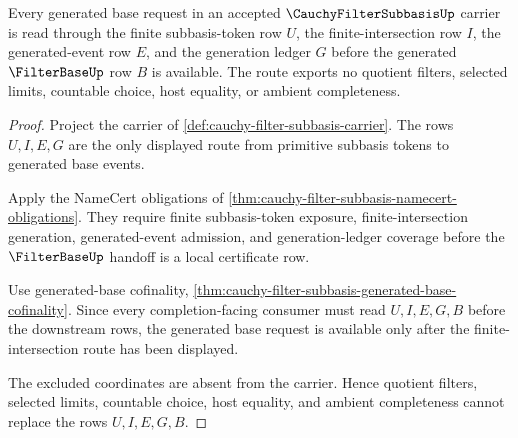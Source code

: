 \begin{theorem}
\label{thm:cauchy-filter-subbasis-finite-intersection-route}
Every generated base request in an accepted $\CauchyFilterSubbasisUp$ carrier is read through the finite subbasis-token row $U$, the finite-intersection row $I$, the generated-event row $E$, and the generation ledger $G$ before the generated $\FilterBaseUp$ row $B$ is available. The route exports no quotient filters, selected limits, countable choice, host equality, or ambient completeness.
\end{theorem}
\begin{proof}
Project the carrier of \autoref{def:cauchy-filter-subbasis-carrier}. The rows $U,I,E,G$ are the only displayed route from primitive subbasis tokens to generated base events.

Apply the NameCert obligations of \autoref{thm:cauchy-filter-subbasis-namecert-obligations}. They require finite subbasis-token exposure, finite-intersection generation, generated-event admission, and generation-ledger coverage before the $\FilterBaseUp$ handoff is a local certificate row.

Use generated-base cofinality, \autoref{thm:cauchy-filter-subbasis-generated-base-cofinality}. Since every completion-facing consumer must read $U,I,E,G,B$ before the downstream rows, the generated base request is available only after the finite-intersection route has been displayed.

The excluded coordinates are absent from the carrier. Hence quotient filters, selected limits, countable choice, host equality, and ambient completeness cannot replace the rows $U,I,E,G,B$.
\end{proof}

